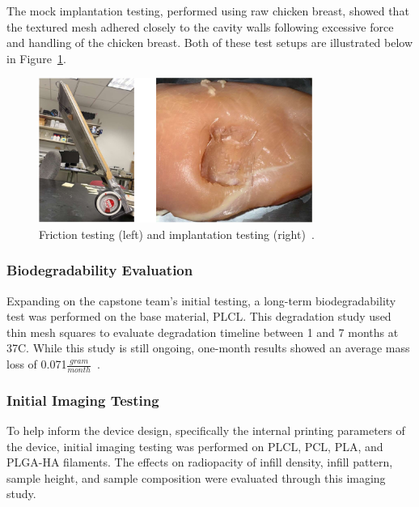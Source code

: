The mock implantation testing, performed using raw chicken breast, showed that the textured mesh adhered closely to the cavity walls following excessive force and handling of the chicken breast. Both of these test setups are illustrated below in Figure~\ref{fig:introduction:frictionAndImplantationTesting}.

\begin{figure}[h!]
        \centering
        \includegraphics[width=0.8\textwidth]{../figs/introduction/friction_and_implantation_testing.png}
        \caption{Friction testing (left) and implantation testing (right)~\cite{RefWorks:RefID:371-bakhtardesign}.}
        \label{fig:introduction:frictionAndImplantationTesting}
\end{figure}

\subsubsection{Biodegradability Evaluation\label{sec:introduction:priorWork:otherTeamWork:biodegradabilityEval}}

Expanding on the capstone team's initial testing, a long-term biodegradability test was performed on the base material, PLCL. This degradation study used thin mesh squares to evaluate degradation timeline between 1 and 7 months at 37\textdegree C. While this study is still ongoing, one-month results showed an average mass loss of 0.071$\frac{gram}{month}$~\cite{RefWorks:RefID:371-bakhtardesign}.

\subsubsection{Initial Imaging Testing}

To help inform the device design, specifically the internal printing parameters of the device, initial imaging testing was performed on PLCL, PCL, PLA, and PLGA-HA filaments. The effects on radiopacity of infill density, infill pattern, sample height, and sample composition were evaluated through this imaging study.

